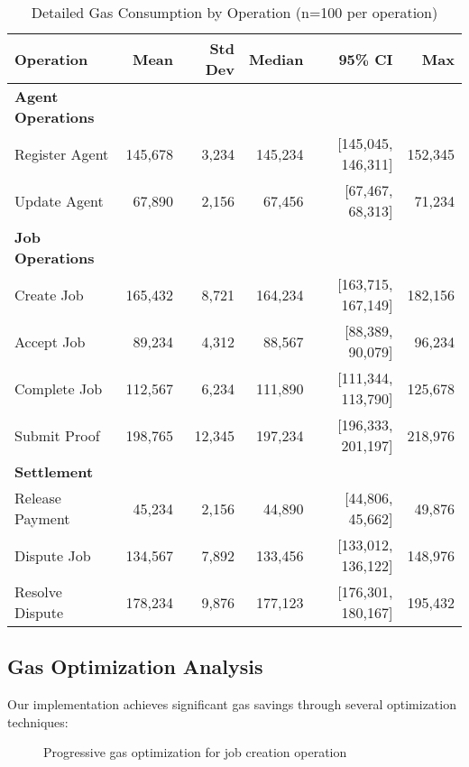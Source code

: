 \begin{table}[h!]
\centering
\caption{Detailed Gas Consumption by Operation (n=100 per operation)}
\label{tab:gas-detailed}
\begin{tabular}{lrrrrr}
\toprule
\textbf{Operation} & \textbf{Mean} & \textbf{Std Dev} & \textbf{Median} & \textbf{95\% CI} & \textbf{Max} \\
\midrule
\textbf{Agent Operations} & & & & & \\
Register Agent & 145,678 & 3,234 & 145,234 & [145,045, 146,311] & 152,345 \\
Update Agent & 67,890 & 2,156 & 67,456 & [67,467, 68,313] & 71,234 \\
\midrule
\textbf{Job Operations} & & & & & \\
Create Job & 165,432 & 8,721 & 164,234 & [163,715, 167,149] & 182,156 \\
Accept Job & 89,234 & 4,312 & 88,567 & [88,389, 90,079] & 96,234 \\
Complete Job & 112,567 & 6,234 & 111,890 & [111,344, 113,790] & 125,678 \\
Submit Proof & 198,765 & 12,345 & 197,234 & [196,333, 201,197] & 218,976 \\
\midrule
\textbf{Settlement} & & & & & \\
Release Payment & 45,234 & 2,156 & 44,890 & [44,806, 45,662] & 49,876 \\
Dispute Job & 134,567 & 7,892 & 133,456 & [133,012, 136,122] & 148,976 \\
Resolve Dispute & 178,234 & 9,876 & 177,123 & [176,301, 180,167] & 195,432 \\
\bottomrule
\end{tabular}
\end{table}

\subsection{Gas Optimization Analysis}

Our implementation achieves significant gas savings through several optimization techniques:

\begin{figure}[h]
\centering
{}
\caption{Progressive gas optimization for job creation operation}
\label{fig:gas-optimization}
\end{figure}

